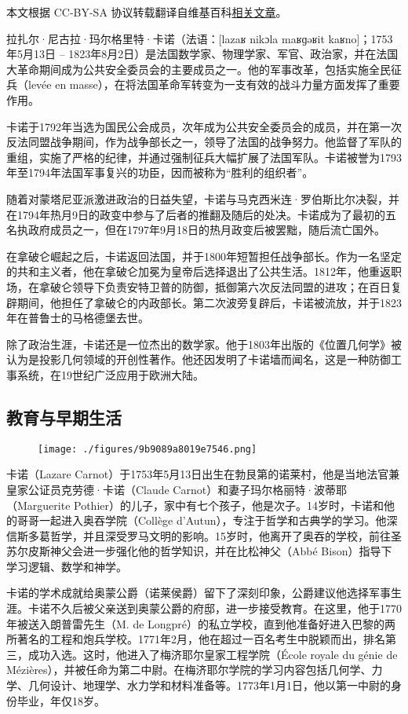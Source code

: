 
本文根据 CC-BY-SA 协议转载翻译自维基百科\href{https://en.wikipedia.org/wiki/Lazare_Carnot#References}{相关文章}。

拉扎尔·尼古拉·玛尔格里特·卡诺（法语：[lazaʁ nikɔla maʁɡəʁit kaʁno]；1753年5月13日 – 1823年8月2日）是法国数学家、物理学家、军官、政治家，并在法国大革命期间成为公共安全委员会的主要成员之一。他的军事改革，包括实施全民征兵（levée en masse），在将法国革命军转变为一支有效的战斗力量方面发挥了重要作用。

卡诺于1792年当选为国民公会成员，次年成为公共安全委员会的成员，并在第一次反法同盟战争期间，作为战争部长之一，领导了法国的战争努力。他监督了军队的重组，实施了严格的纪律，并通过强制征兵大幅扩展了法国军队。卡诺被誉为1793年至1794年法国军事复兴的功臣，因而被称为“胜利的组织者”。

随着对蒙塔尼亚派激进政治的日益失望，卡诺与马克西米连·罗伯斯比尔决裂，并在1794年热月9日的政变中参与了后者的推翻及随后的处决。卡诺成为了最初的五名执政府成员之一，但在1797年9月18日的热月政变后被罢黜，随后流亡国外。

在拿破仑崛起之后，卡诺返回法国，并于1800年短暂担任战争部长。作为一名坚定的共和主义者，他在拿破仑加冕为皇帝后选择退出了公共生活。1812年，他重返职场，在拿破仑领导下负责安特卫普的防御，抵御第六次反法同盟的进攻；在百日复辟期间，他担任了拿破仑的内政部长。第二次波旁复辟后，卡诺被流放，并于1823年在普鲁士的马格德堡去世。

除了政治生涯，卡诺还是一位杰出的数学家。他于1803年出版的《位置几何学》被认为是投影几何领域的开创性著作。他还因发明了卡诺墙而闻名，这是一种防御工事系统，在19世纪广泛应用于欧洲大陆。
\subsection{教育与早期生活}  
\begin{figure}[ht]
\centering
\texttt{[image: ./figures/9b9089a8019e7546.png]}
\caption{} \label{fig_Lazare_1}
\end{figure}
卡诺（Lazare Carnot）于1753年5月13日出生在勃艮第的诺莱村，他是当地法官兼皇家公证员克劳德·卡诺（Claude Carnot）和妻子玛尔格丽特·波蒂耶（Marguerite Pothier）的儿子，家中有七个孩子，他是次子。14岁时，卡诺和他的哥哥一起进入奥吞学院（Collège d'Autun），专注于哲学和古典学的学习。他深信斯多葛哲学，并且深受罗马文明的影响。15岁时，他离开了奥吞的学校，前往圣苏尔皮斯神父会进一步强化他的哲学知识，并在比松神父（Abbé Bison）指导下学习逻辑、数学和神学。

卡诺的学术成就给奥蒙公爵（诺莱侯爵）留下了深刻印象，公爵建议他选择军事生涯。卡诺不久后被父亲送到奥蒙公爵的府邸，进一步接受教育。在这里，他于1770年被送入朗普雷先生（M. de Longpré）的私立学校，直到他准备好进入巴黎的两所著名的工程和炮兵学校。1771年2月，他在超过一百名考生中脱颖而出，排名第三，成功入选。这时，他进入了梅济耶尔皇家工程学院（École royale du génie de Mézières），并被任命为第二中尉。在梅济耶尔学院的学习内容包括几何学、力学、几何设计、地理学、水力学和材料准备等。1773年1月1日，他以第一中尉的身份毕业，年仅18岁。

